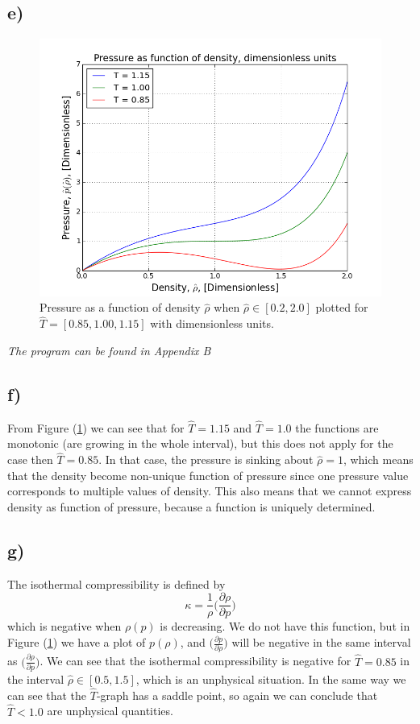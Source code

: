 \documentclass{scrartcl}
\begin{document}
\subsection*{e)}
\begin{figure}[H]
\centering
\includegraphics[width=120mm]{oblig3_2.png}
\caption{Pressure as a function of density $\hat{\rho}$ when $\hat{\rho}\in[0.2, 2.0]$ plotted for $\hat{T}=[0.85, 1.00, 1.15]$ with dimensionless units.}
\label{fig:e}
\end{figure}
\textit{The program can be found in Appendix B}

\subsection*{f)}
From Figure (\ref{fig:e}) we can see that for $\hat{T}=1.15$ and $\hat{T}=1.0$ the functions are monotonic (are growing in the whole interval), but this does not apply for the case then $\hat{T}=0.85$. In that case, the pressure is sinking about $\hat{\rho}=1$, which means that the density become non-unique function of pressure since one pressure value corresponds to multiple values of density. This also means that we cannot express density as function of pressure, because a function is uniquely determined. 

\subsection*{g)}
The isothermal compressibility is defined by
\begin{equation}
\kappa=\frac{1}{\rho}\bigg(\frac{\partial\rho}{\partial p}\bigg)
\end{equation}
which is negative when $\rho(p)$ is decreasing. We do not have this function, but in Figure (\ref{fig:e}) we have a plot of $p(\rho)$, and $\Big(\frac{\partial p}{\partial\rho}\Big)$ will be negative in the same interval as $\Big(\frac{\partial\rho}{\partial p}\Big)$. We can see that the isothermal compressibility is negative for $\hat{T}=0.85$ in the interval $\hat{\rho}\in[0.5,1.5]$, which is an unphysical situation. In the same way we can see that the $\hat{T}$-graph has a saddle point, so again we can conclude that $\hat{T}<1.0$ are unphysical quantities.
\end{document}
